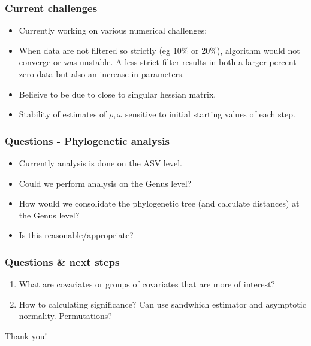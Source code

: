 \documentclass{beamer}
\begin{document}
\begin{frame}
\frametitle{Current challenges}
\begin{itemize}
  \item Currently working on various numerical challenges:
  \item When data are not filtered so strictly (eg 10\% or 20\%), algorithm would not converge or was unstable. A less strict filter results in both a larger percent zero data but also an increase in parameters.
  \item Belieive to be due to close to singular hessian matrix.
  \item Stability of estimates of $\rho, \omega$ sensitive to initial starting values of each step.
\end{itemize}
\end{frame}
\begin{frame}
\frametitle{Questions - Phylogenetic analysis}
\begin{itemize}
  \item Currently analysis is done on the ASV level.
  \item Could we perform analysis on the Genus level?
  \item How would we consolidate the phylogenetic tree (and calculate distances) at the Genus level?
  \item Is this reasonable/appropriate?
\end{itemize}
\end{frame}

\begin{frame}
\frametitle{Questions \& next steps}
\begin{enumerate}
  \item What are covariates or groups of covariates that are more of interest?
  \item How to calculating significance? Can use sandwhich estimator and asymptotic normality. Permutations?
\end{enumerate}
\end{frame}

\begin{frame}

Thank you!

\end{frame}





  
\end{document}
